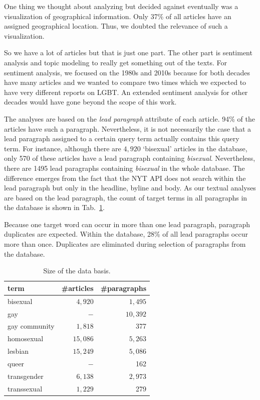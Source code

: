 \documentclass[10pt,a4paper,twocolumn]{scrartcl}
\begin{document}
One thing we thought about analyzing but decided against eventually was a visualization of geographical information. Only 37\% of all articles have an assigned geographical location. Thus, we doubted the relevance of such a visualization.

So we have a lot of articles but that is just one part. The other part is sentiment analysis and topic modeling to really get something out of the texts. For sentiment analysis, we focused on the 1980s and 2010s because for both decades have many articles and we wanted to compare two times which we expected to have very different reports on LGBT. An extended sentiment analysis for other decades would have gone beyond the scope of this work.

The analyses are based on the \textit{lead paragraph} attribute of each article. 94\% of the articles have such a paragraph. Nevertheless, it is not necessarily the case that a lead paragraph assigned to a certain query term actually contains this query term. For instance, although there are $4,920$ `bisexual' articles in the database, only 570 of these articles have a lead paragraph containing \textit{bisexual}. Nevertheless, there are 1495 lead paragraphs containing \textit{bisexual} in the whole database. The difference emerges from the fact that the NYT API does not search within the lead paragraph but only in the headline, byline and body. As our textual analyses are based on the lead paragraph, the count of target terms in all paragraphs in the database is shown in Tab.~\ref{tab:dataBasis}.

Because one target word can occur in more than one lead paragraph, paragraph duplicates are expected. Within the database, 28\% of all lead paragraphs occur more than once. Duplicates are eliminated during selection of paragraphs from the database.

\begin{table}
\centering
\caption{Size of the data basis.} \label{tab:dataBasis}
\begin{tabular}{lrr}
\toprule
term	 & \#articles & \#paragraphs\\
\midrule
bisexual &  $4,920$ & $1,495$\\
gay			& $-$ & $10,392$\\
gay community & $1,818$ & 377\\
homosexual  & $15,086$ & $5,263$\\
lesbian & $15,249$ & $5,086$\\
queer  & $-$ & 162\\
transgender  & $6,138$ & $2,973$\\
transsexual  & $1,229$ & 279\\
\bottomrule
\end{tabular}
\end{table}
\end{document}
